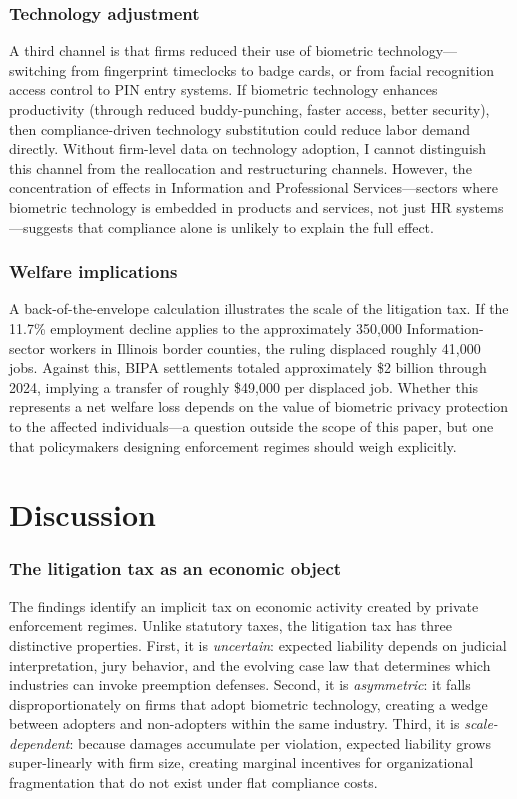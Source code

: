\documentclass[12pt]{article}
\begin{document}
\subsubsection*{Technology adjustment} A third channel is that firms reduced their use of biometric technology---switching from fingerprint timeclocks to badge cards, or from facial recognition access control to PIN entry systems. If biometric technology enhances productivity (through reduced buddy-punching, faster access, better security), then compliance-driven technology substitution could reduce labor demand directly. Without firm-level data on technology adoption, I cannot distinguish this channel from the reallocation and restructuring channels. However, the concentration of effects in Information and Professional Services---sectors where biometric technology is embedded in products and services, not just HR systems---suggests that compliance alone is unlikely to explain the full effect.

\subsubsection*{Welfare implications} A back-of-the-envelope calculation illustrates the scale of the litigation tax. If the 11.7\% employment decline applies to the approximately 350,000 Information-sector workers in Illinois border counties, the ruling displaced roughly 41,000 jobs. Against this, BIPA settlements totaled approximately \$2 billion through 2024, implying a transfer of roughly \$49,000 per displaced job. Whether this represents a net welfare loss depends on the value of biometric privacy protection to the affected individuals---a question outside the scope of this paper, but one that policymakers designing enforcement regimes should weigh explicitly.

\section{Discussion}
\label{sec:discussion}

\subsubsection*{The litigation tax as an economic object} The findings identify an implicit tax on economic activity created by private enforcement regimes. Unlike statutory taxes, the litigation tax has three distinctive properties. First, it is \textit{uncertain}: expected liability depends on judicial interpretation, jury behavior, and the evolving case law that determines which industries can invoke preemption defenses. Second, it is \textit{asymmetric}: it falls disproportionately on firms that adopt biometric technology, creating a wedge between adopters and non-adopters within the same industry. Third, it is \textit{scale-dependent}: because damages accumulate per violation, expected liability grows super-linearly with firm size, creating marginal incentives for organizational fragmentation that do not exist under flat compliance costs.
\end{document}
